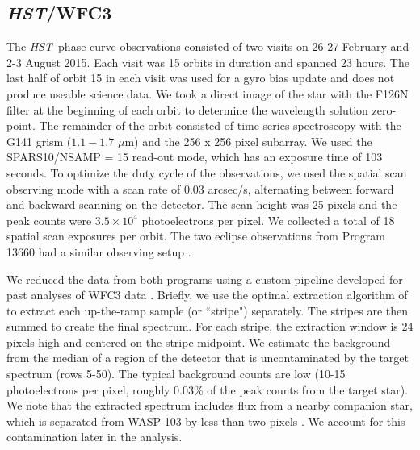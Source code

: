 \documentclass[twocolumn]{aastex61}
\newcommand{\project}[1]{\textsl{#1}}
\newcommand{\HST}{\project{HST}}
\begin{document}
\subsection{\HST/WFC3}
The \HST\ phase curve observations consisted of two visits on 26-27 February and 2-3 August 2015. Each visit was 15 orbits in duration and spanned 23 hours. The last half of orbit 15 in each visit was used for a gyro bias update and does not produce useable science data.  We took a direct image of the star with the F126N filter at the beginning of each orbit to determine the wavelength solution zero-point. The remainder of the orbit consisted of time-series spectroscopy with the G141 grism ($1.1 - 1.7$ $\mu$m) and the 256 x 256 pixel subarray. We used the SPARS10/NSAMP = 15 read-out mode, which has an exposure time of 103 seconds. To optimize the duty cycle of the observations, we used the spatial scan observing mode with a scan rate of 0.03 arcsec/s, alternating between forward and backward scanning on the detector. The scan height was 25 pixels and the peak counts were $3.5\times10^4$ photoelectrons per pixel. We collected a total of 18 spatial scan exposures per orbit.  The two eclipse observations from Program 13660 had a similar observing setup \citep[described in detail in][]{cartier17}.  

We reduced the data from both programs using a custom pipeline developed for past analyses of WFC3 data \citep[for details see][]{kreidberg14a, kreidberg14b, kreidberg15b}. Briefly, we use the optimal extraction algorithm of \cite{horne86} to extract each up-the-ramp sample (or ``stripe") separately. The stripes are then summed to create the final spectrum. For each stripe, the extraction window is 24 pixels high and centered on the stripe midpoint. We estimate the background from the median of a region of the detector that is uncontaminated by the target spectrum (rows 5-50). The typical background counts are low (10-15 photoelectrons per pixel, roughly 0.03\% of the peak counts from the target star). We note that the extracted spectrum includes flux from a nearby companion star, which is separated from WASP-103 by less than two pixels \citep[0.2";][]{wollert15}. We account for this contamination later in the analysis. 
\end{document}

